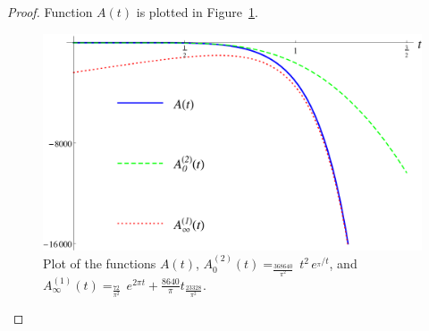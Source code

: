 \begin{proof}
Function $A(t)$ is plotted in Figure~\ref{fig: A}.
\begin{figure}[h!]
\caption{Plot of the functions $A(t)$, $A^{(2)}_0(t)=_\frac{368640}{\pi^2}\,t^2\,e^{_\pi /t}$, and $A^{(1)}_\infty(t)=_\frac{72}{\pi^2}\,e^{2\pi t}+\frac{8640}{\pi}t_\frac{23328}{\pi^2}$.\label{fig: A}}
  \centering
\includegraphics[width=300 pt]{graphics/e8plot_A.pdf}
\end{figure}


\end{proof}
